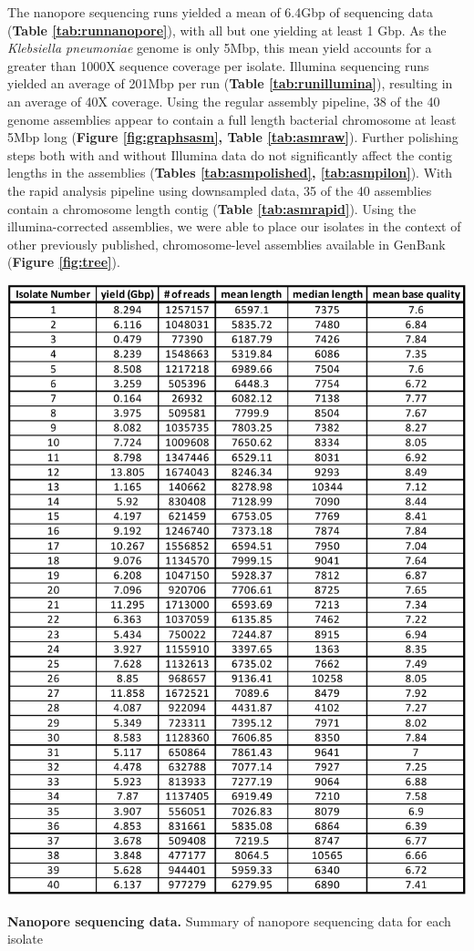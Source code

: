 The nanopore sequencing runs yielded a mean of 6.4Gbp of sequencing data ({\bf Table \ref{tab:runnanopore}}), with all but one yielding at least 1 Gbp. As the \textit{Klebsiella pneumoniae} genome is only 5Mbp, this mean yield accounts for a greater than 1000X sequence coverage per isolate. Illumina sequencing runs yielded an average of 201Mbp per run ({\bf Table \ref{tab:runillumina}}), resulting in an average of 40X coverage. Using the regular assembly pipeline, 38 of the 40 genome assemblies appear to contain a full length bacterial chromosome at least 5Mbp long ({\bf Figure \ref{fig:graphsasm}, Table \ref{tab:asmraw}}). Further polishing steps both with and without Illumina data do not significantly affect the contig lengths in the assemblies ({\bf Tables \ref{tab:asmpolished}, \ref{tab:asmpilon}}). With the rapid analysis pipeline using downsampled data, 35 of the 40 assemblies contain a chromosome length contig ({\bf Table \ref{tab:asmrapid}}). Using the illumina-corrected assemblies, we were able to place our isolates in the context of other previously published, chromosome-level assemblies available in GenBank ({\bf Figure \ref{fig:tree}}).

\begin{table}[!ht]
\centering
\includegraphics[width = .7\linewidth,keepaspectratio]{figure/runnanopore.pdf}
\caption[Nanopore sequencing data]{{\bf Nanopore sequencing data.} Summary of nanopore sequencing data for each isolate }
\label{tab:runnanopore}
\end{table}


